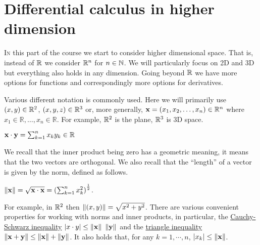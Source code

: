 \chapter{Differential calculus in higher dimension}
\bookletstart

\lettrine{I}{n} this part of the course we start to consider higher dimensional space.
That is, instead of \(\mathbb{R}\) we consider \(\mathbb{R}^n\) for \(n\in \mathbb{N}\).
We will particularly focus on 2D and 3D but everything also holds in any dimension.
Going beyond \(\mathbb{R}\) we have more options for functions and correspondingly more options for derivatives.

Various different notation is commonly used.
Here we will primarily use \((x,y)\in \mathbb{R}^2\), \((x,y,z)\in\mathbb{R}^3\) or, more generally,  \(\mathbf{x} =(x_1,x_2,\ldots,x_n) \in \mathbb{R}^n \)
where
\( x_1 \in \mathbb{R},\ldots, x_n \in \mathbb{R}\).
For example, \(\mathbb{R}^2\) is the plane, \(\mathbb{R}^3\) is 3D space.

\begin{definition}
    \(\mathbf{x} \cdot \mathbf{y} = \sum_{k=1}^{n} x_k y_k \in \mathbb{R}\)
\end{definition}

\noindent
We recall that the inner product being zero has a geometric meaning, it means that the two vectors are orthogonal.
We also recall that the ``length'' of a vector is given by the norm, defined as follows.

\begin{definition}[norm]
    \(\left\|\mathbf{x}\right\| =  \sqrt{\mathbf{x} \cdot \mathbf{x}} = {(\sum_{k=1}^{n} x_k^2 )}^{\frac{1}{2}}\).
\end{definition}

\noindent
For example, in \(\mathbb{R}^2\) then \(\left\|(x,y)\right\| = \sqrt{x^2 + y^2}\).
There are various convenient properties for working with norms and inner products, in particular, the \href{https://en.wikipedia.org/wiki/Cauchy%E2%80%93Schwarz_inequality}{Cauchy-Schwarz inequality} \(\left|x\cdot y\right| \leq \left\|\mathbf{x}\right\| \ \left\|\mathbf{y}\right\|\) and the \href{https://en.wikipedia.org/wiki/Triangle_inequality}{triangle inequality} \(\left\|\mathbf{x} + \mathbf{y}\right\| \leq \left\|\mathbf{x}\right\| + \left\|\mathbf{y}\right\|\).
It also holds that, for any $k = 1,\cdots, n$, $|x_k| \le \left\|\mathbf{x}\right\|$.


